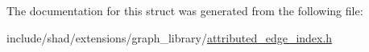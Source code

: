 The documentation for this struct was generated from the following file\-:\begin{DoxyCompactItemize}
\item 
include/shad/extensions/graph\-\_\-library/\hyperlink{attributed__edge__index_8h}{attributed\-\_\-edge\-\_\-index.\-h}\end{DoxyCompactItemize}
